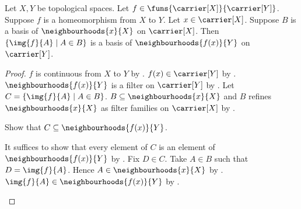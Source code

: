 \begin{theorem}\label{neighbourhood_filter_basis_homeomorphism_image}
    Let $X,Y$ be topological spaces.
    Let $f\in\funs{\carrier[X]}{\carrier[Y]}$.
    Suppose $f$ is a homeomorphism from $X$ to $Y$.
    Let $x\in\carrier[X]$.
    Suppose $B$ is a basis of $\neighbourhoods{x}{X}$ on $\carrier[X]$.
    Then $\{\img{f}{A}\mid A\in B\}$ is a basis of
        $\neighbourhoods{f(x)}{Y}$ on $\carrier[Y]$.
\end{theorem}
\begin{proof}
    $f$ is continuous from $X$ to $Y$ by .
    $f(x)\in\carrier[Y]$ by .
    $\neighbourhoods{f(x)}{Y}$ is a filter on $\carrier[Y]$
        by .
    Let $C=\{\img{f}{A}\mid A\in B\}$.
    $B\subseteq\neighbourhoods{x}{X}$ and
        $B$ refines $\neighbourhoods{x}{X}$
            as filter families on $\carrier[X]$
        by .

    Show that $C\subseteq\neighbourhoods{f(x)}{Y}$.
    \begin{subproof}
        It suffices to show that every element of $C$ is an element of
            $\neighbourhoods{f(x)}{Y}$ by .
        Fix $D\in C$.
        Take $A\in B$ such that $D=\img{f}{A}$.
        Hence $A\in\neighbourhoods{x}{X}$ by .
        $\img{f}{A}\in\neighbourhoods{f(x)}{Y}$
            by .
    \end{subproof}


\end{proof}
